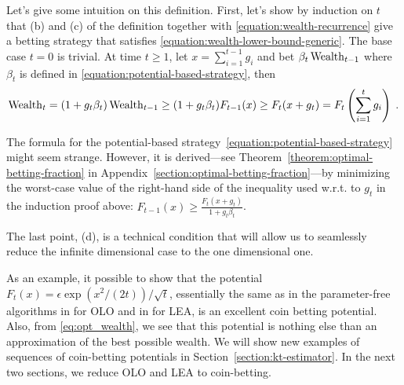 Let's give some intuition on this definition.  First, let's show by induction
on $t$ that (b) and (c) of the definition together with
\eqref{equation:wealth-recurrence} give a betting strategy that satisfies
\eqref{equation:wealth-lower-bound-generic}. The base case $t=0$ is trivial. At
time $t \ge 1$, let $x = \sum_{i=1}^{t-1} g_i$ and bet $\beta_t \operatorname{Wealth}_{t-1}$
where $\beta_t$ is defined in \eqref{equation:potential-based-strategy}, then
\vspace{-.2cm}
\[
\operatorname{Wealth}_t
= (1+g_t \beta_t) \operatorname{Wealth}_{t-1}
\ge (1 + g_t \beta_t) F_{t-1}(x)
\ge F_t(x + g_t)
= F_t \left( \sum_{i=1}^t g_i \right) \; .
\]

The formula for the potential-based
strategy~\eqref{equation:potential-based-strategy} might seem strange. However,
it is derived---see Theorem~\ref{theorem:optimal-betting-fraction} in
Appendix~\ref{section:optimal-betting-fraction}---by minimizing the worst-case
value of the right-hand side of the inequality used w.r.t. to $g_t$ in the
induction proof above: $F_{t-1}(x) \ge \tfrac{F_{t}(x + g_t)}{1+g_t\beta_t}$.

The last point, (d), is a technical condition that will allow us to
seamlessly reduce the infinite dimensional case to the one dimensional one.

As an example, it possible to show that the potential $F_t(x)=\epsilon
\exp \left(x^2/(2t)\right)/\sqrt{t}$, essentially the same as in
the parameter-free algorithms in \cite{McMahan-Orabona-2014, Orabona-2014} for
\ac{OLO} and in \cite{Chaudhuri-Freund-Hsu-2009, Luo-Schapire-2014,
Luo-Schapire-2015} for \ac{LEA}, is an excellent coin betting potential.  Also, from \eqref{eq:opt_wealth}, we see that this potential is nothing else than an approximation of the best possible wealth.
We will show new examples of sequences of coin-betting potentials in
Section~\ref{section:kt-estimator}.  In the next two sections, we reduce
\ac{OLO} and \ac{LEA} to coin-betting.
